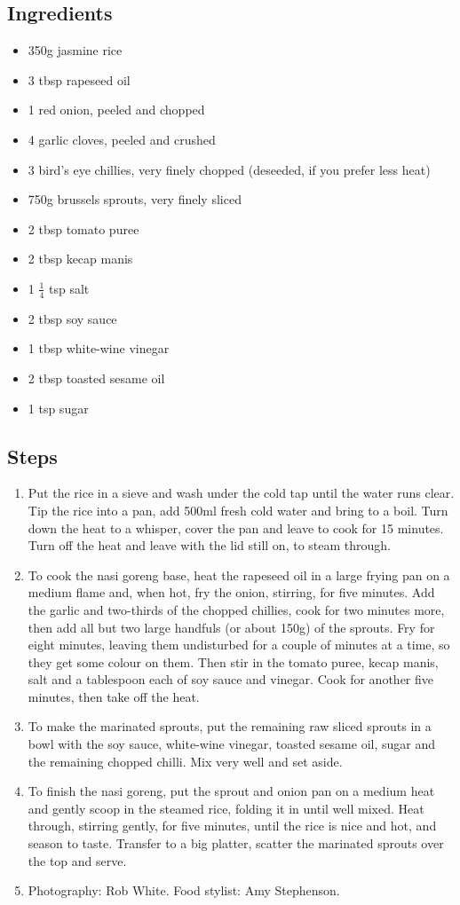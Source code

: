 \documentclass{book}
\begin{document}
\subsection*{Ingredients}
\begin{itemize}
\item 350g jasmine rice
\item 3 tbsp rapeseed oil 
\item 1 red onion, peeled and chopped 
\item 4 garlic cloves, peeled and crushed 
\item 3 bird’s eye chillies, very finely chopped (deseeded, if you prefer less heat)
\item 750g brussels sprouts, very finely sliced 
\item 2 tbsp tomato puree
\item 2 tbsp kecap manis
\item 1 $\frac{1}{4}$ tsp salt
\item 2 tbsp soy sauce 
\item 1 tbsp white-wine vinegar 
\item 2 tbsp toasted sesame oil 
\item 1 tsp sugar
\end{itemize}

\subsection*{Steps}
\begin{enumerate}
\item Put the rice in a sieve and wash under the cold tap until the water runs clear. Tip the rice into a pan, add 500ml fresh cold water and bring to a boil. Turn down the heat to a whisper, cover the pan and leave to cook for 15 minutes. Turn off the heat and leave with the lid still on, to steam through.
\item To cook the nasi goreng base, heat the rapeseed oil in a large frying pan on a medium flame and, when hot, fry the onion, stirring, for five minutes. Add the garlic and two-thirds of the chopped chillies, cook for two minutes more, then add all but two large handfuls (or about 150g) of the sprouts. Fry for eight minutes, leaving them undisturbed for a couple of minutes at a time, so they get some colour on them. Then stir in the tomato puree, kecap manis, salt and a tablespoon each of soy sauce and vinegar. Cook for another five minutes, then take off the heat.
\item To make the marinated sprouts, put the remaining raw sliced sprouts in a bowl with the soy sauce, white-wine vinegar, toasted sesame oil, sugar and the remaining chopped chilli. Mix very well and set aside.
\item To finish the nasi goreng, put the sprout and onion pan on a medium heat and gently scoop in the steamed rice, folding it in until well mixed. Heat through, stirring gently, for five minutes, until the rice is nice and hot, and season to taste. Transfer to a big platter, scatter the marinated sprouts over the top and serve.
\item Photography: Rob White. Food stylist: Amy Stephenson.
\end{enumerate}
\newpage
\end{document}
